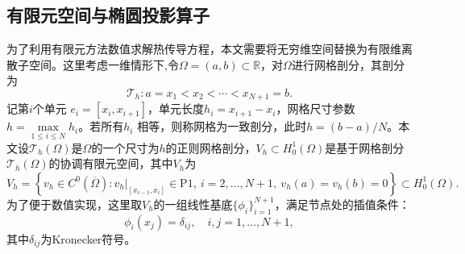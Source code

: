\documentclass{GZUbachelorthesis}
\theoremstyle{chineseplain}
\begin{document}
\subsection{有限元空间与椭圆投影算子}
为了利用有限元方法数值求解热传导方程，本文需要将无穷维空间替换为有限维离散子空间。这里考虑一维情形下,令$\Omega=(a,b)\subset \mathbb{R}$，对$\Omega$进行网格剖分，其剖分为
\[
\mathcal{T}_h: a = x_1 < x_2 < \cdots < x_{N+1} = b.
\]
记第$i$个单元 $e_i = [x_i, x_{i+1}]$，单元长度$h_i = x_{i+1}-x_i$，网格尺寸参数$h = \max\limits_{1 \le i \le N} h_i$。若所有$h_i$ 相等，则称网格为一致剖分，此时$h = (b-a)/N$。本文设$\mathcal{T}_h(\Omega)$是$\Omega$的一个尺寸为$h$的正则网格剖分，$V_h \subset H^1_0(\Omega)$是基于网格剖分$\mathcal{T}_h(\Omega)$的协调有限元空间\cite{xu2025finite}，其中$V_h$为
\begin{equation}
	V_h = \left\{v_h \in C^0(\overline{\Omega}) : \left. v_h \right|_{[x_{i-1},x_i]} \in \mathrm{P}1, \ i = 2, \ldots, N+1,\ v_h(a) = v_h(b) = 0 \right\} \subset H^1_0(\Omega).
	\label{eq:Vh}
\end{equation}
为了便于数值实现，这里取$V_h$的一组线性基底$\{\phi_i\}_{i=1}^{N+1}$，满足节点处的插值条件：
\begin{equation}
	\phi_i(x_j) = \delta_{ij}, \quad i, j = 1, \ldots, N+1,
	\label{eq:fem-basis-property}
\end{equation}
其中$\delta_{ij}$为Kronecker符号。
\end{document}
